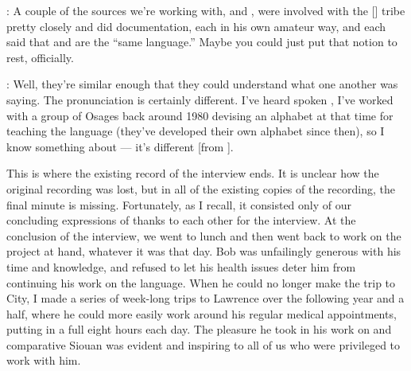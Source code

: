 \documentclass[output=paper]{LSP/langsci}
\begin{document}
: A couple of the sources we're working with,  and , were involved with the [] tribe pretty closely and did documentation, each in his own amateur way, and each said that  and  are the ``same language.'' Maybe you could just put that notion to rest, officially.

: Well, they're similar enough that they could understand what one another was saying. The pronunciation is certainly different. I've heard spoken , I've worked with a group of Osages back around 1980 devising an alphabet at that time for teaching the language (they've developed their own alphabet since then), so I know something about  --- it's different [from ].

\noindent This is where the existing record of the interview ends. It is unclear how the original recording was lost, but in all of the existing copies of the recording, the final minute is missing. Fortunately, as I recall, it consisted only of our concluding expressions of thanks to each other for the interview. At the conclusion of the interview, we went to lunch and then went back to work on the project at hand, whatever it was that day. Bob was unfailingly generous with his time and knowledge, and refused to let his health issues deter him from continuing his work on the language. When he could no longer make the trip to  City, I made a series of week-long trips to Lawrence over the following year and a half, where he could more easily work around his regular medical appointments, putting in a full eight hours each day. The pleasure he took in his work on  and comparative Siouan was evident and inspiring to all of us who were privileged to work with him. 

\printbibliography[heading=subbibliography,notkeyword=this] 
\end{document}
